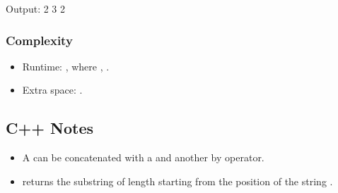 \documentclass[letterpaper,12pt,english]{book}
\begin{document}
\begin{sphinxVerbatim}[commandchars=\\\{\}]
Output:
2
3
2
\end{sphinxVerbatim}


\subsubsection{Complexity}
\label{\detokenize{String/08_STR_929_Unique_Email_Addresses:id2}}\begin{itemize}
\item {} 
\sphinxAtStartPar
Runtime: , where , .

\item {} 
\sphinxAtStartPar
Extra space: .

\end{itemize}


\subsection{C++ Notes}
\label{\detokenize{String/08_STR_929_Unique_Email_Addresses:c-notes}}\begin{itemize}
\item {} 
\sphinxAtStartPar
A  can be concatenated with a  and another  by \sphinxcode{\sphinxupquote{+}} operator.

\end{itemize}

\begin{sphinxVerbatim}[commandchars=\\\{\}]
\end{sphinxVerbatim}
\begin{itemize}
\item {} 
\sphinxAtStartPar
{}%
\begin{footnote}[39]\sphinxAtStartFootnote
{}
%
\end{footnote} returns the substring of length  starting from the position  of the string .

\end{itemize}
\end{document}

